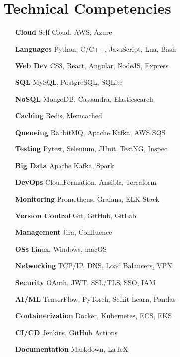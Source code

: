 \section{Technical Competencies}

\begin{multicols}{2}
    \begin{itemize}[itemsep=-2px, parsep=1pt, leftmargin=75pt]
        \item[\textbf{Cloud}] Self-Cloud, AWS, Azure
        \item[\textbf{Languages}] Python, C/C++, JavaScript, Lua, Bash
        \item[\textbf{Web Dev}] CSS, React, Angular, NodeJS, Express
        \item[\textbf{SQL}] MySQL, PostgreSQL, SQLite
        \item[\textbf{NoSQL}] MongoDB, Cassandra, Elasticsearch
        \item[\textbf{Caching}] Redis, Memcached
        \item[\textbf{Queueing}] RabbitMQ, Apache Kafka, AWS SQS
        \item[\textbf{Testing}] Pytest, Selenium, JUnit, TestNG, Inspec
        \item[\textbf{Big Data}] Apache Kafka, Spark
        \item[\textbf{DevOps}] CloudFormation, Ansible, Terraform
        \item[\textbf{Monitoring}] Prometheus, Grafana, ELK Stack
        \item[\textbf{Version Control}] Git, GitHub, GitLab
        \item[\textbf{Management}] Jira, Confluence
        \item[\textbf{OSs}] Linux, Windows, macOS
        \item[\textbf{Networking}] TCP/IP, DNS, Load Balancers, VPN
        \item[\textbf{Security}] OAuth, JWT, SSL/TLS, SSO, IAM
        \item[\textbf{AI/ML}] TensorFlow, PyTorch, Scikit-Learn, Pandas
        \item[\textbf{Containerization}] Docker, Kubernetes, ECS, EKS
        \item[\textbf{CI/CD}] Jenkins, GitHub Actions
        \item[\textbf{Documentation}] Markdown, LaTeX
    \end{itemize}
\end{multicols}
